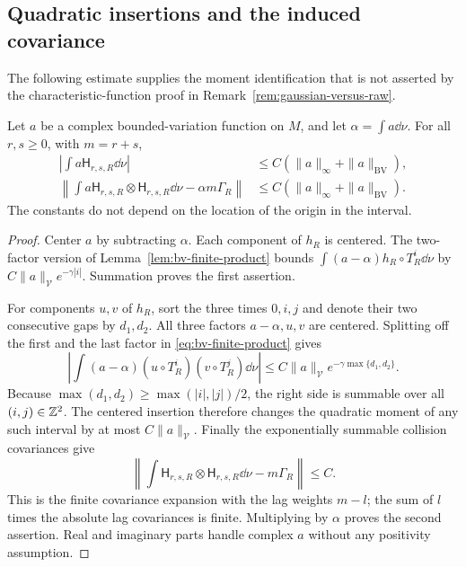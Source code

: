 \subsection{Quadratic insertions and the induced covariance}
The following estimate supplies the moment identification that is not
asserted by the characteristic-function proof in
Remark~\ref{rem:gaussian-versus-raw}.

\begin{lemma}
\label{lem:quadratic-collision-insertion}
Let $a$ be a complex bounded-variation function on $M$, and let
$\alpha=\int a\dd\nu$. For all $r,s\ge0$, with $m=r+s$,
\begin{align}
 \left|\int a\mathsf H_{r,s,R}\dd\nu\right|
       &\le C(\|a\|_\infty+\|a\|_{\mathrm{BV}}),
       \label{eq:linear-insertion-moment}\\
 \left\|\int a\mathsf H_{r,s,R}\otimes\mathsf H_{r,s,R}\dd\nu
                          -\alpha m\Gamma_R\right\|
       &\le C(\|a\|_\infty+\|a\|_{\mathrm{BV}}).
       \label{eq:quadratic-insertion-moment}
\end{align}
The constants do not depend on the location of the origin in the interval.
\end{lemma}
\begin{proof}
Center $a$ by subtracting $\alpha$. Each component of $h_R$ is
centered. The two-factor version of
Lemma~\ref{lem:bv-finite-product} bounds
$\int(a-\alpha)h_R\circ T_R^i\dd\nu$ by
$C\|a\|_{\mathcal V}e^{-\gamma|i|}$. Summation proves the first
assertion.

For components $u,v$ of $h_R$, sort the three times $0,i,j$ and
denote their two consecutive gaps by $d_1,d_2$. All three factors
$a-\alpha,u,v$ are centered. Splitting off the first and the last
factor in \eqref{eq:bv-finite-product} gives
\[
 \left|\int(a-\alpha)(u\circ T_R^i)(v\circ T_R^j)\dd\nu\right|
       \le C\|a\|_{\mathcal V}e^{-\gamma\max\{d_1,d_2\}}.
\]
Because $\max(d_1,d_2)\ge\max(|i|,|j|)/2$, the right side is
summable over all $(i,j)\in\mathbb Z^2$. The centered insertion therefore
changes the quadratic moment of any such interval by at most
$C\|a\|_{\mathcal V}$. Finally the exponentially summable collision
covariances give
\[
 \left\|\int\mathsf H_{r,s,R}\otimes\mathsf H_{r,s,R}\dd\nu
                                  -m\Gamma_R\right\|\le C.
\]
This is the finite covariance expansion with the lag weights $m-l$;
the sum of $l$ times the absolute lag covariances is finite. Multiplying
by $\alpha$ proves the second assertion. Real and imaginary parts
handle complex $a$ without any positivity assumption.
\end{proof}

